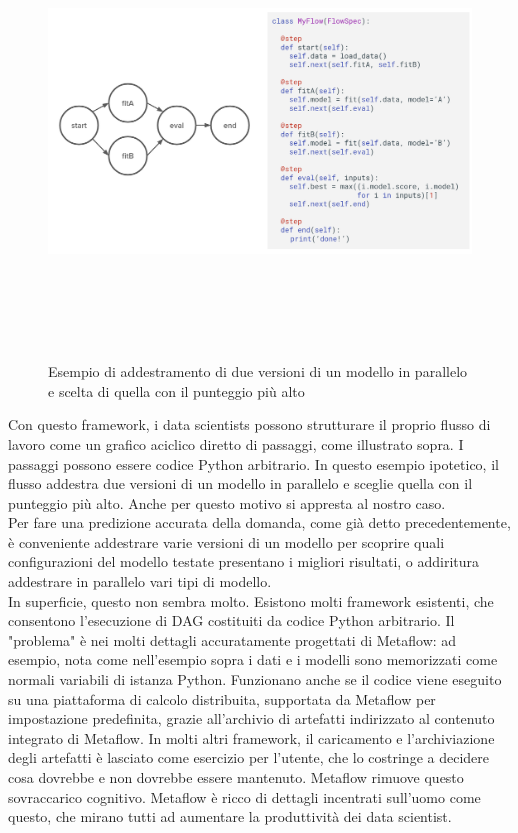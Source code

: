 \documentclass[12pt,a4paper]{report}
\begin{document}
\begin{figure}[h!]
    \begin{center}
        \includegraphics[width=12cm,height=12cm,keepaspectratio]{MetaFlow}
    \end{center}
    \caption{Esempio di addestramento di due versioni di un modello in parallelo e scelta di quella con il punteggio più alto}
    \label{fig:ex-MetaFlow}
\end{figure}

Con questo framework, i data scientists possono strutturare il proprio flusso di lavoro come un grafico aciclico diretto di passaggi, come illustrato sopra. I passaggi possono essere codice Python arbitrario. In questo esempio ipotetico, il flusso addestra due versioni di un modello in parallelo e sceglie quella con il punteggio più alto. Anche per questo motivo si appresta al nostro caso.\\
Per fare una predizione accurata della domanda, come già detto precedentemente, è conveniente addestrare varie versioni di un modello per scoprire quali configurazioni del modello testate presentano i migliori risultati, o addiritura addestrare in parallelo vari tipi di modello.\\
In superficie, questo non sembra molto. Esistono molti framework esistenti, che consentono l'esecuzione di DAG costituiti da codice Python arbitrario. Il "problema" è nei molti dettagli accuratamente progettati di Metaflow: ad esempio, nota come nell'esempio sopra i dati e i modelli sono memorizzati come normali variabili di istanza Python. Funzionano anche se il codice viene eseguito su una piattaforma di calcolo distribuita, supportata da Metaflow per impostazione predefinita, grazie all'archivio di artefatti indirizzato al contenuto integrato di Metaflow. In molti altri framework, il caricamento e l'archiviazione degli artefatti è lasciato come esercizio per l'utente, che lo costringe a decidere cosa dovrebbe e non dovrebbe essere mantenuto. Metaflow rimuove questo sovraccarico cognitivo.
Metaflow è ricco di dettagli incentrati sull'uomo come questo, che mirano tutti ad aumentare la produttività dei data scientist.\\
\end{document}
